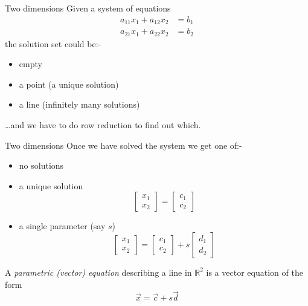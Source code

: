 \documentclass{beamer}
\begin{document}
\begin{frame}{Two dimensions}
  Given a system of equations
  \begin{align*}
    a_{11}x_1+a_{12}x_2 & = b_1\\
    a_{21}x_1+a_{22}x_2 & = b_2
  \end{align*}
  the solution set could be:-
  \begin{itemize}
  \item empty
  \item a point (a unique solution)
  \item a line (infinitely many solutions)
  \end{itemize}
  \dots and we have to do row reduction to find out which.
\end{frame}

\begin{frame}{Two dimensions}
  Once we have solved the system we get one of:-
  \begin{itemize}
  \item no solutions
  \item a unique solution
    \begin{equation*}
      \left[
	\begin{array}{c}
          x_1\\
          x_2
	\end{array}
      \right]=
      \left[
	\begin{array}{c}
          c_1\\
          c_2
	\end{array}
      \right]
    \end{equation*}
  \item a single parameter (say $s$)
    \begin{equation*}
      \left[
	\begin{array}{c}
          x_1\\
          x_2
	\end{array}
      \right] = \left[
	\begin{array}{c}
          c_1\\
          c_2
	\end{array}
      \right]+s \left[
	\begin{array}{c}
          d_1\\
          d_2
	\end{array}
      \right]
    \end{equation*}
  \end{itemize}
  \begin{definition}
    A \emph{parametric (vector) equation} describing a line in $\mathbb R^2$ is a vector equation of the form
    \begin{equation*}
      \vec{x} = \vec{c}+s\vec{d}
    \end{equation*}
  \end{definition}
\end{frame}
\end{document}
